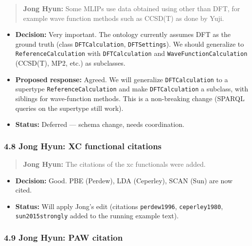 \begin{quote}
\textbf{Jong Hyun:} Some MLIPs use data obtained using other than DFT, for example wave function methods such as CCSD(T) as done by Yuji.
\end{quote}

\begin{itemize}
\tightlist
\item
  \textbf{Decision:} Very important. The ontology currently assumes DFT as the ground truth (class \texttt{DFTCalculation}, \texttt{DFTSettings}). We should generalize to \texttt{ReferenceCalculation} with \texttt{DFTCalculation} and \texttt{WaveFunctionCalculation} (CCSD(T), MP2, etc.) as subclasses.
\item
  \textbf{Proposed response:} Agreed. We will generalize \texttt{DFTCalculation} to a supertype \texttt{ReferenceCalculation} and make \texttt{DFTCalculation} a subclass, with siblings for wave-function methods. This is a non-breaking change (SPARQL queries on the supertype still work).
\item
  \textbf{Status:} {\color{orange!80!black}\faPauseCircle} Deferred --- schema change, needs coordination.
\end{itemize}

\subsubsection{4.8 Jong Hyun: XC functional citations}\label{jong-hyun-xc-functional-citations}

\begin{quote}
\textbf{Jong Hyun:} The citations of the xc functionals were added.
\end{quote}

\begin{itemize}
\tightlist
\item
  \textbf{Decision:} Good. PBE (Perdew), LDA (Ceperley), SCAN (Sun) are now cited.
\item
  \textbf{Status:} {\color{green!60!black}\faCheckCircle} Will apply Jong's edit (citations \texttt{perdew1996}, \texttt{ceperley1980}, \texttt{sun2015strongly} added to the running example text).
\end{itemize}

\subsubsection{4.9 Jong Hyun: PAW citation}\label{jong-hyun-paw-citation}

